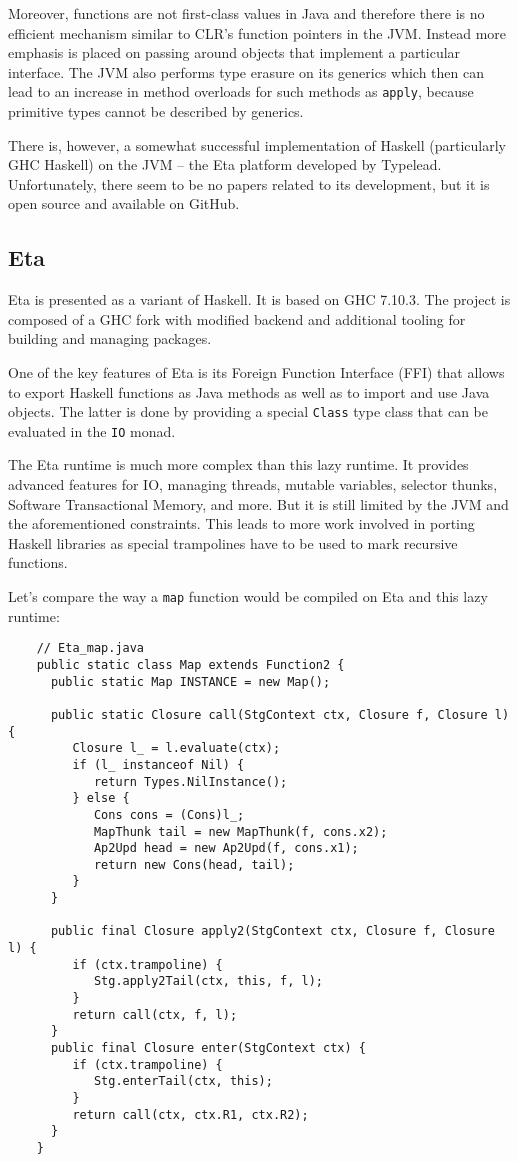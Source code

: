 \documentclass[en]{pracamgr}
\begin{document}
Moreover, functions are not first-class values in Java
and therefore there is no efficient mechanism similar
to CLR's function pointers in the JVM.
Instead more emphasis is placed on passing around objects
that implement a particular interface.
The JVM also performs type erasure on its generics
which then can lead to an increase in
method overloads for such methods as \texttt{apply},
because primitive types cannot be described by generics.

There is, however, a somewhat successful implementation of
Haskell (particularly GHC Haskell) on the JVM -- the Eta
platform developed by Typelead. Unfortunately, there seem
to be no papers related to its development, but it is
open source and available on GitHub.

\subsection{Eta}

Eta is presented as a variant of Haskell. It is based on
GHC 7.10.3. The project is composed of a GHC fork with
modified backend and additional tooling for building
and managing packages.

One of the key features of Eta is its Foreign Function Interface (FFI)
that allows to export Haskell functions as Java methods
as well as to import and use Java objects.
The latter is done by providing a special \texttt{Class} type class
that can be evaluated in the \texttt{IO} monad.

The Eta runtime is much more complex than this lazy runtime.
It provides advanced features for IO, managing threads, mutable variables,
selector thunks, Software Transactional Memory, and more.
But it is still limited by the JVM and the aforementioned
constraints. This leads to more work involved in porting
Haskell libraries as special trampolines have to be used
to mark recursive functions.

Let's compare the way a \texttt{map} function would be compiled
on Eta and this lazy runtime:

\begin{verbatim}
    // Eta_map.java
    public static class Map extends Function2 {
      public static Map INSTANCE = new Map();

      public static Closure call(StgContext ctx, Closure f, Closure l) {
         Closure l_ = l.evaluate(ctx);
         if (l_ instanceof Nil) {
            return Types.NilInstance();
         } else {
            Cons cons = (Cons)l_;
            MapThunk tail = new MapThunk(f, cons.x2);
            Ap2Upd head = new Ap2Upd(f, cons.x1);
            return new Cons(head, tail);
         }
      }

      public final Closure apply2(StgContext ctx, Closure f, Closure l) {
         if (ctx.trampoline) {
            Stg.apply2Tail(ctx, this, f, l);
         }
         return call(ctx, f, l);
      }
      public final Closure enter(StgContext ctx) {
         if (ctx.trampoline) {
            Stg.enterTail(ctx, this);
         }
         return call(ctx, ctx.R1, ctx.R2);
      }
    }
\end{verbatim}
\end{document}
